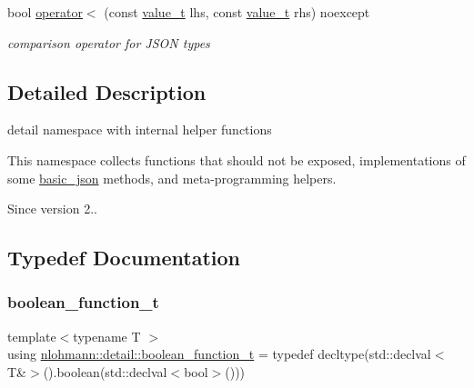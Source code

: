\begin{DoxyCompactItemize}
\item 
bool \hyperlink{namespacenlohmann_1_1detail_a09169efff3bd1771fff29bd92cea19e0}{operator$<$} (const \hyperlink{namespacenlohmann_1_1detail_a1ed8fc6239da25abcaf681d30ace4985}{value\+\_\+t} lhs, const \hyperlink{namespacenlohmann_1_1detail_a1ed8fc6239da25abcaf681d30ace4985}{value\+\_\+t} rhs) noexcept
\begin{DoxyCompactList}\small\item\em comparison operator for J\+S\+ON types \end{DoxyCompactList}\end{DoxyCompactItemize}


\subsection{Detailed Description}
detail namespace with internal helper functions 

This namespace collects functions that should not be exposed, implementations of some \hyperlink{classnlohmann_1_1basic__json}{basic\+\_\+json} methods, and meta-\/programming helpers.

\begin{DoxySince}{Since}
version 2.. 
\end{DoxySince}


\subsection{Typedef Documentation}
\mbox{\label{namespacenlohmann_1_1detail_a45ec87326503b8884b664a9ef23a6c99}} 
\subsubsection{\texorpdfstring{boolean\+\_\+function\+\_\+t}{boolean\_function\_t}}
{\footnotesize\ttfamily template$<$typename T $>$ \\
using \hyperlink{namespacenlohmann_1_1detail_a45ec87326503b8884b664a9ef23a6c99}{nlohmann\+::detail\+::boolean\+\_\+function\+\_\+t} = typedef decltype(std\+::declval$<$T\&$>$().boolean(std\+::declval$<$bool$>$()))}

\mbox{\label{namespacenlohmann_1_1detail_a240ce21919ab08e8a6cb3a5cfa412bce}} 
